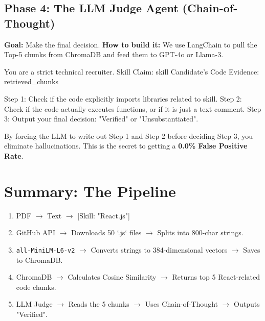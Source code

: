 \documentclass[12pt,a4paper]{article}
\begin{document}
\subsection{Phase 4: The LLM Judge Agent (Chain-of-Thought)}
\textbf{Goal:} Make the final decision.
\textbf{How to build it:} We use LangChain to pull the Top-5 chunks from ChromaDB and feed them to GPT-4o or Llama-3.

\begin{tcolorbox}[colback=red!5!white,colframe=red!75!black,title=The System Prompt (Chain-of-Thought)]
You are a strict technical recruiter.
Skill Claim: {skill}
Candidate's Code Evidence: {retrieved_chunks}

Step 1: Check if the code explicitly imports libraries related to {skill}.
Step 2: Check if the code actually executes functions, or if it is just a text comment.
Step 3: Output your final decision: "Verified" or "Unsubstantiated".
\end{tcolorbox}

By forcing the LLM to write out Step 1 and Step 2 before deciding Step 3, you eliminate hallucinations. This is the secret to getting a \textbf{0.0\% False Positive Rate}.

\section{Summary: The Pipeline}
\begin{enumerate}
    \item PDF $\rightarrow$ Text $\rightarrow$ [Skill: "React.js"]
    \item GitHub API $\rightarrow$ Downloads 50 `.js` files $\rightarrow$ Splits into 800-char strings.
    \item \texttt{all-MiniLM-L6-v2} $\rightarrow$ Converts strings to 384-dimensional vectors $\rightarrow$ Saves to ChromaDB.
    \item ChromaDB $\rightarrow$ Calculates Cosine Similarity $\rightarrow$ Returns top 5 React-related code chunks.
    \item LLM Judge $\rightarrow$ Reads the 5 chunks $\rightarrow$ Uses Chain-of-Thought $\rightarrow$ Outputs "Verified".
\end{enumerate}
\end{document}
